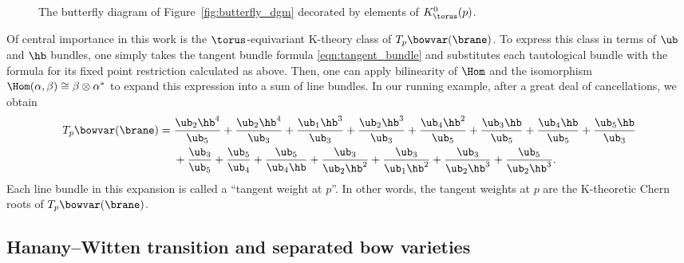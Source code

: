\begin{figure}[t]
\caption{The butterfly diagram of Figure~\ref{fig:butterfly_dgm} decorated by elements of $K^0_\torus(p)$.}
\label{fig:butterfly_mons}
\end{figure}

Of central importance in this work is the $\torus$-equivariant K-theory class of $T_p\bowvar(\brane)$. To express this class in terms of $\ub$ and $\hb$ bundles, one simply takes the tangent bundle formula \eqref{eqn:tangent_bundle} and substitutes each tautological bundle with the formula for its fixed point restriction calculated as above. Then, one can apply bilinearity of $\Hom$ and the isomorphism $\Hom(\alpha, \beta)\cong \beta\otimes\alpha^*$ to expand this expression into a sum of line bundles. In our running example, after a great deal of cancellations, we obtain
\begin{align}
T_p\bowvar(\brane) ={}& \frac{\ub_2\hb^4}{\ub_5} + \frac{\ub_2\hb^4}{\ub_3} + \frac{\ub_1\hb^3}{\ub_3} + \frac{\ub_2\hb^3}{\ub_3}
+ \frac{\ub_4\hb^2}{\ub_5} + \frac{\ub_3\hb}{\ub_5} + \frac{\ub_4\hb}{\ub_5} + \frac{\ub_5\hb}{\ub_3}\nonumber \\
& + \frac{\ub_3}{\ub_5}
+ \frac{\ub_5}{\ub_4} + \frac{\ub_5}{\ub_4\hb} + \frac{\ub_3}{\ub_2\hb^2} + \frac{\ub_3}{\ub_1\hb^2} + \frac{\ub_3}{\ub_2\hb^3}
+ \frac{\ub_5}{\ub_2\hb^3}.\label{eqn:cancel}
\end{align}
Each line bundle in this expansion is called a ``tangent weight at $p$''. In other words, the tangent weights at $p$ are the K-theoretic Chern roots of $T_p\bowvar(\brane)$.

\subsection{Hanany--Witten transition and separated bow varieties} \label{sec:HW}

